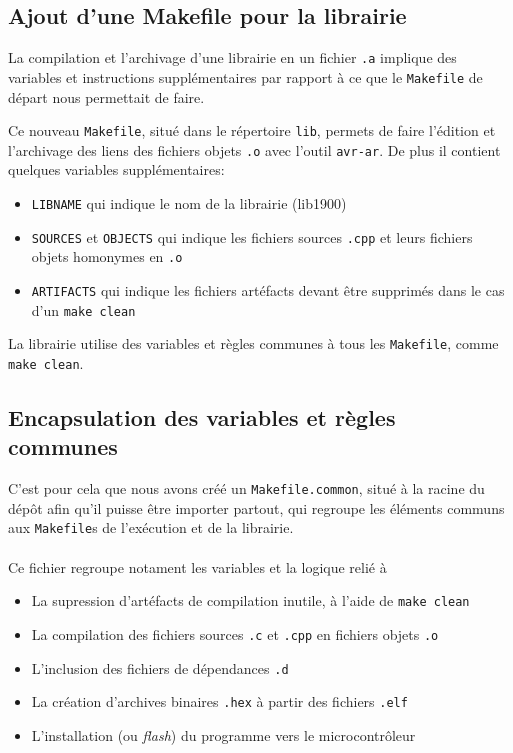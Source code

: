 \documentclass[12pt]{scrartcl}
\begin{document}
\subsection{Ajout d'une Makefile pour la librairie}
La compilation et l'archivage d'une librairie en un fichier \texttt{.a} implique
des variables et instructions supplémentaires par rapport à ce que le
\texttt{Makefile} de départ nous permettait de faire.

Ce nouveau \texttt{Makefile},
situé dans le répertoire \texttt{lib}, permets de faire l'édition et l'archivage
des liens des fichiers objets \texttt{.o} avec l'outil \texttt{avr-ar}. De plus il
contient quelques variables supplémentaires:
\begin{itemize}
    \item \verb|LIBNAME| qui indique le nom de la librairie (lib1900)
    \item \verb|SOURCES| et \verb|OBJECTS| qui indique les fichiers sources \verb|.cpp|
          et leurs fichiers objets homonymes en \verb|.o|
    \item \verb|ARTIFACTS| qui indique les fichiers artéfacts devant être supprimés
          dans le cas d'un \verb|make clean|
\end{itemize}
La librairie utilise des variables et règles communes à tous les \verb|Makefile|,
comme \verb|make clean|.

\subsection{Encapsulation des variables et règles communes}
C'est pour cela que nous avons créé un \verb|Makefile.common|, situé à la racine
du dépôt afin qu'il puisse être importer partout, qui regroupe les éléments communs
aux \verb|Makefile|s de l'exécution et de la librairie.
\\ \\
Ce fichier regroupe notament les variables et la logique relié à
\begin{itemize}
    \item La supression d'artéfacts de compilation inutile, à l'aide de \verb|make clean|
    \item La compilation des fichiers sources \verb|.c| et \verb|.cpp| en fichiers
          objets \verb|.o|
    \item L'inclusion des fichiers de dépendances \verb|.d|
    \item La création d'archives binaires \verb|.hex| à partir des fichiers
          \verb|.elf|
    \item L'installation (ou \textit{flash}) du programme vers le
          microcontrôleur
\end{itemize}
\end{document}
